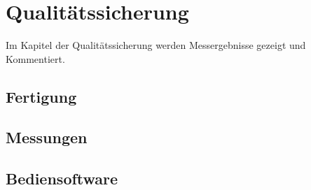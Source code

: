 \section{Qualitätssicherung}
Im Kapitel der Qualitätssicherung werden Messergebnisse gezeigt und Kommentiert.
\subsection{Fertigung}%

\subsection{Messungen}%

\subsection{Bediensoftware}%
